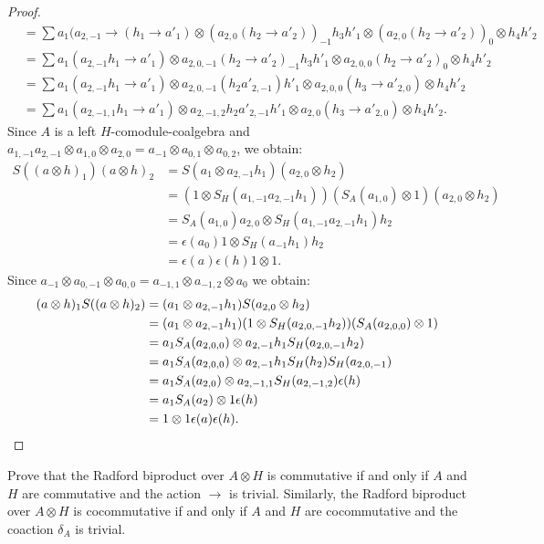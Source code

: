 \documentclass[12pt]{amsproc}
\begin{document}
\begin{proof}
\begin{align*}
 & =\sum a_{1}(a_{2,-1}\to(h_{1}\to a'_{1})\otimes(a_{2,0}(h_{2}\to a'_{2}))_{-1}h_{3}h'_{1}\otimes(a_{2,0}(h_{2}\to a'_{2}))_{0}\otimes h_{4}h'_{2}\\
 & =\sum a_{1}(a_{2,-1}h_{1}\to a'_{1})\otimes a_{2,0,-1}(h_{2}\to a'_{2})_{-1}h_{3}h'_{1}\otimes a_{2,0,0}(h_{2}\to a'_{2})_{0}\otimes h_{4}h'_{2}\\
 & =\sum a_{1}(a_{2,-1}h_{1}\to a'_{1})\otimes a_{2,0,-1}(h_{2}a'_{2,-1})h'_{1}\otimes a_{2,0,0}(h_{3}\to a'_{2,0})\otimes h_{4}h'_{2}\\
 & =\sum a_{1}(a_{2,-1,1}h_{1}\to a'_{1})\otimes a_{2,-1,2}h_{2}a'_{2,-1}h'_{1}\otimes a_{2,0}(h_{3}\to a'_{2,0})\otimes h_{4}h'_{2}.
\end{align*}
Since $A$ is a left $H$-comodule-coalgebra and $a_{1,-1}a_{2,-1}\otimes a_{1,0}\otimes a_{2,0}=a_{-1}\otimes a_{0,1}\otimes a_{0,2}$,
we obtain: 
\begin{align*}
S((a\otimes h)_{1})(a\otimes h)_{2} & =S(a_{1}\otimes a_{2,-1}h_{1})(a_{2,0}\otimes h_{2})\\
 & =(1\otimes S_{H}(a_{1,-1}a_{2,-1}h_{1}))(S_{A}(a_{1,0})\otimes1)(a_{2,0}\otimes h_{2})\\
 & =S_{A}(a_{1,0})a_{2,0}\otimes S_{H}(a_{1,-1}a_{2,-1}h_{1})h_{2}\\
 & =\epsilon(a_{0})1\otimes S_{H}(a_{-1}h_{1})h_{2}\\
 & =\epsilon(a)\epsilon(h)1\otimes1.
\end{align*}
Since $a_{-1}\otimes a_{0,-1}\otimes a_{0,0}=a_{-1,1}\otimes a_{-1,2}\otimes a_{0}$ we obtain:
\begin{align*}
(a\otimes h)_{1}S((a\otimes h)_{2}) & =(a_{1}\otimes a_{2,-1}h_{1})S(a_{2,0}\otimes h_{2})\\
 & =(a_{1}\otimes a_{2,-1}h_{1})(1\otimes S_{H}(a_{2,0,-1}h_{2}))(S_{A}(a_{2,0,0})\otimes1)\\
 & =a_{1}S_{A}(a_{2,0,0})\otimes a_{2,-1}h_{1}S_{H}(a_{2,0,-1}h_{2})\\
 & =a_{1}S_{A}(a_{2,0,0})\otimes a_{2,-1}h_{1}S_{H}(h_{2})S_{H}(a_{2,0,-1})\\
 & =a_{1}S_{A}(a_{2,0})\otimes a_{2,-1,1}S_{H}(a_{2,-1,2})\epsilon(h)\\
 & =a_{1}S_{A}(a_{2})\otimes1\epsilon(h)\\
 & =1\otimes1\epsilon(a)\epsilon(h).\qedhere
 \end{align*}
\end{proof}

\begin{exercise}
Prove that the Radford biproduct over $A\otimes H$ is commutative if and only
if $A$ and $H$ are commutative and the action $\to$ is trivial.  Similarly,
the Radford biproduct over $A\otimes H$ is cocommutative if and only if $A$ and
$H$ are cocommutative and the coaction $\delta_{A}$ is trivial.
\end{exercise}
\end{document}
